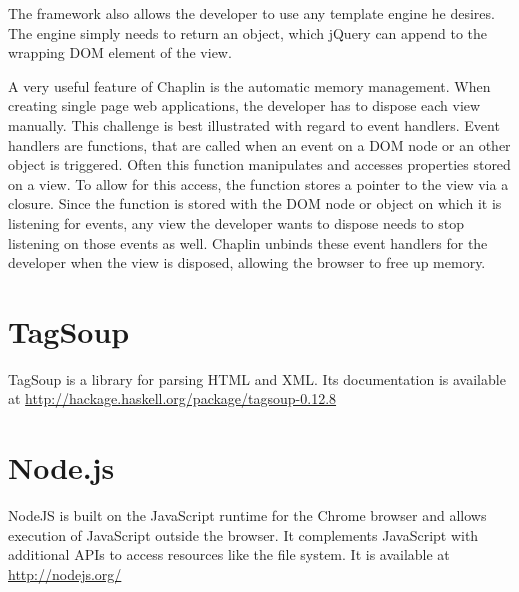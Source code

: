 \documentclass[thesis.tex]{subfiles}
\begin{document}
The framework also allows the developer to use any template engine he desires.
The engine simply needs to return an object, which jQuery can append to the
wrapping DOM element of the view.

A very useful feature of Chaplin is the automatic memory management.
When creating single page web applications, the developer has to dispose each
view manually. This challenge is best illustrated with regard to event handlers.
Event handlers are functions, that are called when an event on a DOM node or
an other object is triggered. Often this function manipulates and accesses
properties stored on a view. To allow for this access, the function stores a
pointer to the view via a closure. Since the function is stored with the
DOM node or object on which it is listening for events, any view the developer
wants to dispose needs to stop listening on those events as well.
Chaplin unbinds these event handlers for the developer when the view is
disposed, allowing the browser to free up memory.

\section{TagSoup}
\label{app:tagsoup}
TagSoup is a library for parsing HTML and XML. Its documentation is available at
\url{http://hackage.haskell.org/package/tagsoup-0.12.8}

\section{Node.js}
\label{app:nodejs}
NodeJS is built on the JavaScript runtime for the Chrome browser and allows
execution of JavaScript outside the browser. It complements JavaScript with
additional APIs to access resources like the file system.
It is available at \url{http://nodejs.org/}
\end{document}

